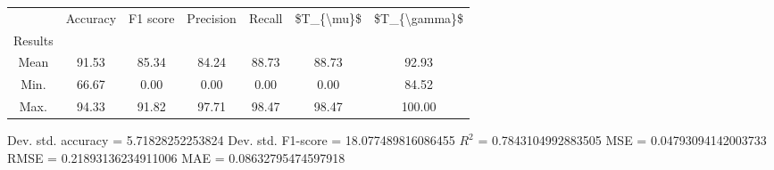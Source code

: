 \begin{tabular}{|c|c|c|c|c|c|c|}
\toprule
{} &  Accuracy &  F1 score &  Precision &  Recall &  \$T\_\{\textbackslash mu\}\$ &  \$T\_\{\textbackslash gamma\}\$ \\
Results &           &           &            &         &            &               \\
\hline
Mean    &     91.53 &     85.34 &      84.24 &   88.73 &      88.73 &         92.93 \\
Min.    &     66.67 &      0.00 &       0.00 &    0.00 &       0.00 &         84.52 \\
Max.    &     94.33 &     91.82 &      97.71 &   98.47 &      98.47 &        100.00 \\
\bottomrule
\end{tabular}

 Dev. std. accuracy = 5.71828252253824
 Dev. std. F1-score = 18.077489816086455
 $R^2$ = 0.7843104992883505
 MSE = 0.04793094142003733
 RMSE = 0.21893136234911006
 MAE = 0.08632795474597918